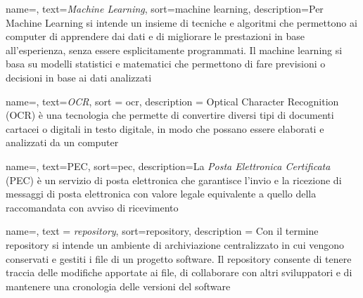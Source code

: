 
 {
    name=,
    text=\emph{Machine Learning},
    sort=machine learning,
    description={Per Machine Learning si intende un insieme di tecniche e algoritmi che permettono ai computer di apprendere dai dati e di migliorare le prestazioni in base all'esperienza, senza essere esplicitamente programmati. Il machine learning si basa su modelli statistici e matematici che permettono di fare previsioni o decisioni in base ai dati analizzati}
}


 {
    name=,
    text=\emph{OCR},
    sort = ocr,
    description = {Optical Character Recognition (OCR) è
    una tecnologia che permette di convertire diversi tipi di documenti cartacei o digitali in testo digitale, in modo che possano essere elaborati e analizzati da un computer}
}

 {
    name=,
    text=PEC,
    sort=pec,
    description={La \emph{Posta Elettronica Certificata} (PEC) è un servizio di posta elettronica che garantisce l'invio e la ricezione di messaggi di posta elettronica con valore legale equivalente a quello della raccomandata con avviso di ricevimento}
}

 {
    name=,
    text = \emph{repository},
    sort=repository,
    description = {Con il termine repository si intende un ambiente di archiviazione centralizzato in cui vengono conservati e gestiti i file di un progetto software. Il repository consente di tenere traccia delle modifiche apportate ai file, di collaborare con altri sviluppatori e di mantenere una cronologia delle versioni del software
    }
}

